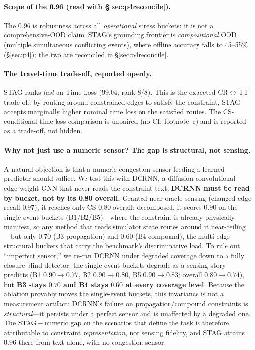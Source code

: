 \paragraph{Scope of the 0.96 (read with \S\ref{sec:p4reconcile}).}
The $0.96$ is robustness across all \emph{operational} stress buckets; it is not a comprehensive-OOD
claim. STAG's grounding frontier is \emph{compositional} OOD (multiple simultaneous conflicting events),
where offline accuracy falls to 45--55\% (\S\ref{sec:p4}); the two are reconciled in \S\ref{sec:p4reconcile}.

\paragraph{The travel-time trade-off, reported openly.}
STAG ranks \emph{last} on Time Loss ($99.04$; rank 8/8). This is the expected CR$\leftrightarrow$TT
trade-off: by routing around constrained edges to satisfy the constraint, STAG accepts marginally higher
nominal time loss on the satisfied routes. The CS-conditional time-loss comparison is unpaired (no CI;
footnote~c) and is reported as a trade-off, not hidden.

\paragraph{Why not just use a numeric sensor? The gap is structural, not sensing.}
A natural objection is that a numeric congestion sensor feeding a learned predictor should suffice.
We test this with DCRNN, a diffusion-convolutional edge-weight GNN that never reads the constraint text.
\textbf{DCRNN must be read by bucket, not by its 0.80 overall.} Granted near-oracle sensing
(changed-edge recall $0.97$), it reaches only CS $0.80$ overall; decomposed, it scores $0.90$ on the
single-event buckets (B1/B2/B5)---where the constraint is already physically manifest, so any method that
reads simulator state routes around it near-ceiling---but only $0.70$ (B3 propagation) and $0.60$ (B4
compound), the multi-edge structural buckets that carry the benchmark's discriminative load. To rule out
``imperfect sensor,'' we re-ran DCRNN under degraded coverage down to a fully closure-blind detector:
the single-event buckets degrade as a sensing story predicts (B1 $0.90{\to}0.77$, B2 $0.90{\to}0.80$,
B5 $0.90{\to}0.83$; overall $0.80{\to}0.74$), but \textbf{B3 stays $0.70$ and B4 stays $0.60$ at every
coverage level}. Because the ablation provably moves the single-event buckets, this invariance is not a
measurement artifact: DCRNN's failure on propagation/compound constraints is \emph{structural}---it
persists under a perfect sensor and is unaffected by a degraded one. The STAG\,$-$\,numeric gap on the
scenarios that define the task is therefore attributable to constraint \emph{representation}, not sensing
fidelity, and STAG attains $0.96$ there from text alone, with no congestion sensor.

